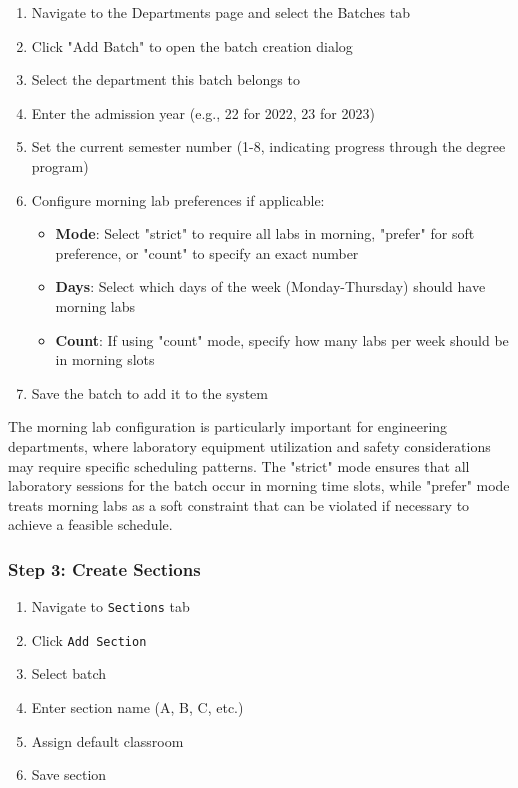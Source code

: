 \documentclass[12pt,a4paper]{article}
\begin{document}
\begin{enumerate}
    \item Navigate to the Departments page and select the Batches tab
    \item Click "Add Batch" to open the batch creation dialog
    \item Select the department this batch belongs to
    \item Enter the admission year (e.g., 22 for 2022, 23 for 2023)
    \item Set the current semester number (1-8, indicating progress through the degree program)
    \item Configure morning lab preferences if applicable:
    \begin{itemize}
        \item \textbf{Mode}: Select "strict" to require all labs in morning, "prefer" for soft preference, or "count" to specify an exact number
        \item \textbf{Days}: Select which days of the week (Monday-Thursday) should have morning labs
        \item \textbf{Count}: If using "count" mode, specify how many labs per week should be in morning slots
    \end{itemize}
    \item Save the batch to add it to the system
\end{enumerate}

The morning lab configuration is particularly important for engineering departments, where laboratory equipment utilization and safety considerations may require specific scheduling patterns. The "strict" mode ensures that all laboratory sessions for the batch occur in morning time slots, while "prefer" mode treats morning labs as a soft constraint that can be violated if necessary to achieve a feasible schedule.

\subsubsection{Step 3: Create Sections}
\begin{enumerate}
    \item Navigate to \texttt{Sections} tab
    \item Click \texttt{Add Section}
    \item Select batch
    \item Enter section name (A, B, C, etc.)
    \item Assign default classroom
    \item Save section
\end{enumerate}
\end{document}
